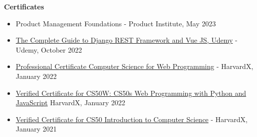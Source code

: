 \textbf{Certificates}

\begin{itemize}
\tightlist
\item
  Product Management Foundations - Product Institute, May 2023
\item
  \href{https://www.udemy.com/certificate/UC-01578667-389d-4dbe-87a9-745d44236120/}{The
  Complete Guide to Django REST Framework and Vue JS, Udemy} - Udemy,
  October 2022
\item
  \href{https://credentials.edx.org/credentials/f8953d993a814ed1b98c214134a51add/}{Professional
  Certificate Computer Science for Web Programming} - HarvardX, January
  2022
\item
  \href{https://courses.edx.org/certificates/625b5a07236944f686b43a7ca8df9b17}{Verified
  Certificate for CS50W: CS50\textquotesingle s Web Programming with
  Python and JavaScript} HarvardX, January 2022
\item
  \href{https://courses.edx.org/certificates/44f08e5f4d5645f6baf08dc0c94f8cda}{Verified
  Certificate for CS50 Introduction to Computer Science} - HarvardX,
  January 2021
\end{itemize}
